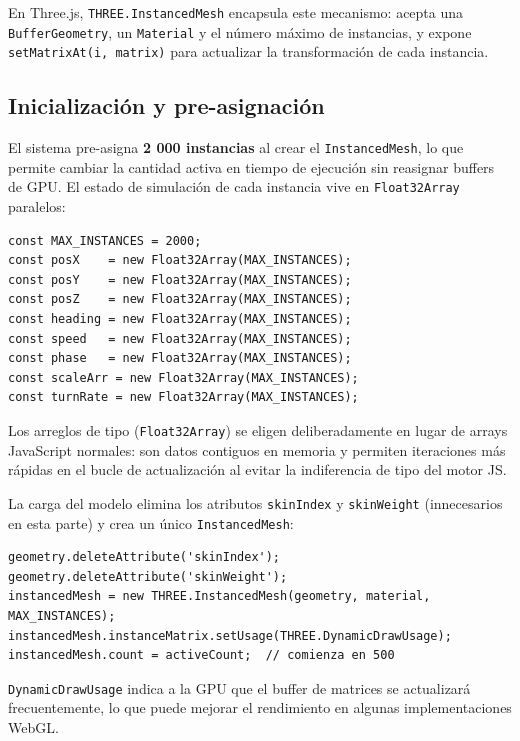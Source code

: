 \documentclass[12pt,a4paper]{article}
\begin{document}
En Three.js, \texttt{THREE.InstancedMesh} encapsula este mecanismo: acepta una
\texttt{BufferGeometry}, un \texttt{Material} y el número máximo de instancias, y
expone \texttt{setMatrixAt(i, matrix)} para actualizar la transformación de cada instancia.

\subsection{Inicialización y pre-asignación}

El sistema pre-asigna \textbf{2 000 instancias} al crear el \texttt{InstancedMesh},
lo que permite cambiar la cantidad activa en tiempo de ejecución sin reasignar buffers
de GPU. El estado de simulación de cada instancia vive en \texttt{Float32Array}
paralelos:

\begin{lstlisting}[style=glsl, language={}]
const MAX_INSTANCES = 2000;
const posX    = new Float32Array(MAX_INSTANCES);
const posY    = new Float32Array(MAX_INSTANCES);
const posZ    = new Float32Array(MAX_INSTANCES);
const heading = new Float32Array(MAX_INSTANCES);
const speed   = new Float32Array(MAX_INSTANCES);
const phase   = new Float32Array(MAX_INSTANCES);
const scaleArr = new Float32Array(MAX_INSTANCES);
const turnRate = new Float32Array(MAX_INSTANCES);
\end{lstlisting}

Los arreglos de tipo (\texttt{Float32Array}) se eligen deliberadamente en lugar de
arrays JavaScript normales: son datos contiguos en memoria y permiten iteraciones
más rápidas en el bucle de actualización al evitar la indiferencia de tipo del motor JS.

La carga del modelo elimina los atributos \texttt{skinIndex} y \texttt{skinWeight}
(innecesarios en esta parte) y crea un único \texttt{InstancedMesh}:

\begin{lstlisting}[style=glsl, language={}]
geometry.deleteAttribute('skinIndex');
geometry.deleteAttribute('skinWeight');
instancedMesh = new THREE.InstancedMesh(geometry, material, MAX_INSTANCES);
instancedMesh.instanceMatrix.setUsage(THREE.DynamicDrawUsage);
instancedMesh.count = activeCount;  // comienza en 500
\end{lstlisting}

\texttt{DynamicDrawUsage} indica a la GPU que el buffer de matrices se actualizará
frecuentemente, lo que puede mejorar el rendimiento en algunas implementaciones WebGL.
\end{document}
